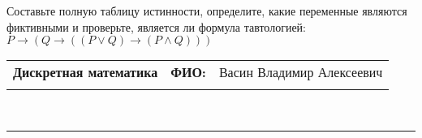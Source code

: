 \documentclass[10pt]{exam}
\newcommand{\class}{Дискретная математика}
\newcommand{\examdate}{}
\begin{document}
\begin{questions}
\begin{enumerate}[a)]
\end{enumerate}\question Составьте полную таблицу истинности, определите, какие переменные являются фиктивными и проверьте, является ли формула тавтологией:
$ P \rightarrow (Q \rightarrow ((P \lor Q) \rightarrow (P \land Q)))$

\end{questions}
\newpage
\begin{flushright}
\begin{tabular}{p{2.8in} r l}
\textbf{\class} & \textbf{ФИО:} &Васин Владимир Алексеевич
\\

\textbf{\examdate} &&\\
\end{tabular}\\
\end{flushright}
\rule[1ex]{\textwidth}{.1pt}
\end{document}
